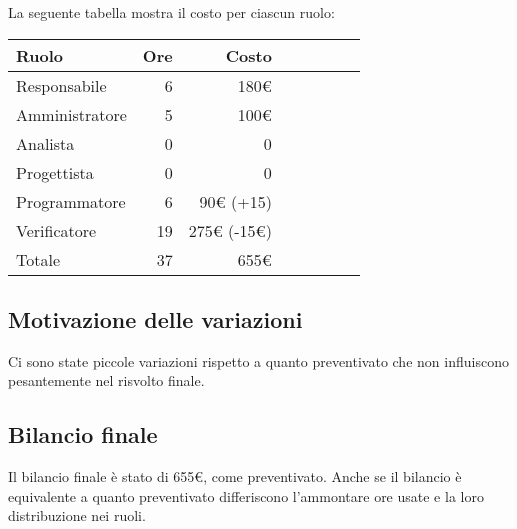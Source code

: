 La seguente tabella mostra il costo per ciascun ruolo:
\begin{table}[ht]
    \begin{tabularx}{\linewidth}{X|rrrrrrr}
    \rowcolor{gray!30}Ruolo & Ore & Costo \\
    \hline
    Responsabile                            & 6    & 180€\\
    \rowcolor{gray!10}Amministratore        & 5    & 100€  \\
    Analista                                & 0    & 0\\
    \rowcolor{gray!10}Progettista           & 0    & 0\\
    Programmatore                           & 6    & 90€ (+15) \\
    \rowcolor{gray!10}Verificatore          & 19   & 275€ (-15€) \\
    \hline Totale                           & 37   & 655€\\ 
    \end{tabularx}
\end{table}

\subsection{Motivazione delle variazioni}
Ci sono state piccole variazioni rispetto a quanto preventivato che non influiscono pesantemente nel risvolto finale.

\subsection{Bilancio finale}
Il bilancio finale è stato di 655€, come preventivato. Anche se il bilancio è equivalente a quanto preventivato differiscono l'ammontare ore usate e la loro distribuzione nei ruoli.
